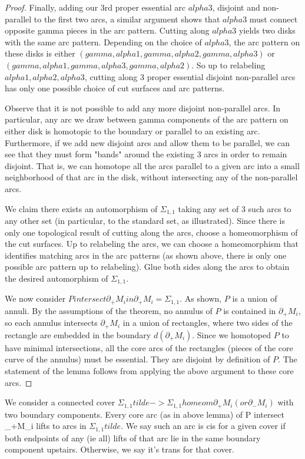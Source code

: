 \documentclass[12pt]{amsart}
\theoremstyle{definition}
\newcommand{\bd}{\partial}
\newcommand{\Si}{\Sigma}
\begin{document}
\begin{proof}
Finally, adding our 3rd proper essential arc $alpha3$, disjoint and non-parallel
to the first two arcs, a similar argument shows that $alpha3$ must connect
opposite gamma pieces in the arc pattern. Cutting along $alpha3$ yields two disks
with the same arc pattern. Depending on the choice of $alpha3$, the arc pattern
on these disks is either $(gamma,alpha1,gamma,alpha2,gamma,alpha3)$ or
$(gamma,alpha1,gamma,alpha3,gamma,alpha2)$. So up to relabeling
$alpha1,alpha2,alpha3$, cutting along 3 proper essential disjoint non-parallel
arcs has only one possible choice of cut surfaces and arc patterns.

Observe that it is not possible to add any more disjoint non-parallel arcs. In
particular, any arc we draw between gamma components of the arc pattern on
either disk is homotopic to the boundary or parallel to an existing arc.
Furthermore, if we add new disjoint arcs and allow them to be parallel, we can
see that they must form "bands" around the existing 3 arcs in order to remain
disjoint. That is, we can homotope all the arcs parallel to a given arc into
a small neighborhood of that arc in the disk, without intersecting any of the
non-parallel arcs.

We claim there exists an automorphism of $\Si_{1,1}$ taking any set of 3 such arcs to
any other set (in particular, to the standard set, as illustrated). Since there
is only one topological result of cutting along the arcs, choose
a homeomorphism of the cut surfaces. Up to relabeling the arcs, we can choose
a homeomorphism that identifies matching arcs in the arc patterns (as shown
above, there is only one possible arc pattern up to relabeling). Glue both
sides along the arcs to obtain the desired automorphism of $\Si_{1,1}$.

We now consider $P intersect \bd_+M_i in \bd_+M_i = \Si_{1,1}$. As shown, $P$ is a union of
annuli. By the assumptions of the theorem, no annulus of $P$ is contained in
$\bd_+M_i$, so each annulus intersects $\bd_+M_i$ in a union of rectangles, where two sides
of the rectangle are embedded in the boundary $d(\bd_+M_i)$. Since we homotoped $P$ to
have minimal intersections, all the core arcs of the rectangles (pieces of the
core curve of the annulus) must be essential. They are disjoint by definition
of $P$. The statement of the lemma follows from applying the above argument to
these core arcs.

\end{proof}

We consider a connected cover $\Si_{1,1}tilde -> \Si_{1,1} homeom \bd_+M_i (or
\bd_-M_i)$ with two
boundary components. Every core arc (as in above lemma) of P intersect \bd_+M_i
lifts to arcs in $\Si_{1,1}tilde$. We say such an arc is cis for a given cover if
both endpoints of any (ie all) lifts of that arc lie in the same boundary
component upstairs. Otherwise, we say it's trans for that cover.
\end{document}
